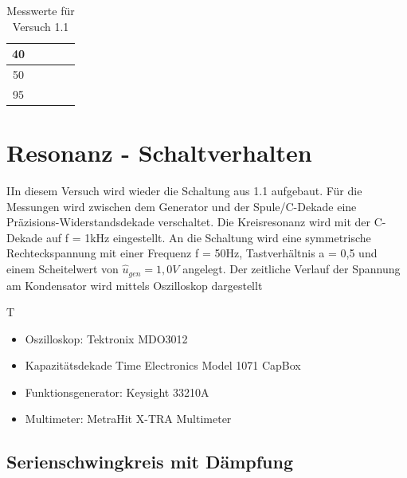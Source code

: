 \documentclass{article}
\begin{document}
\begin{table}[h]
\begin{center}
\begin{tabular}{|c|c|c|c|c|}
      \hline
      40  &                                           &                                          &             &                                   \\
      \hline
      50  &                                           &                                          &             &                                   \\
      \hline
      95  &                                           &                                          &             &                                   \\
      \hline
    \end{tabular}
    \caption{Messwerte für Versuch 1.1}
    \label{tab:MV}
  \end{center}
\end{table}

\newpage
\section{Resonanz - Schaltverhalten}
\begin{task}
  IIn diesem Versuch wird wieder die Schaltung aus 1.1 aufgebaut. Für die Messungen wird zwischen dem Generator und der Spule/C-Dekade eine Präzisions-Widerstandsdekade verschaltet.
  Die Kreisresonanz wird mit der C-Dekade auf f = 1kHz eingestellt. An die Schaltung wird eine symmetrische Rechteckspannung mit einer Frequenz f = 50Hz, Tastverhältnis a = 0,5 und einem Scheitelwert von $\hat{u}_{gen} = 1,0 V$ angelegt.
  Der zeitliche Verlauf der Spannung am Kondensator wird mittels Oszilloskop dargestellt
\end{task}

\begin{devlist}
  T
  \begin{itemize}
    \item Oszilloskop: Tektronix MDO3012
    \item Kapazitätsdekade Time Electronics Model 1071 CapBox
    \item Funktionsgenerator: Keysight 33210A
    \item Multimeter: MetraHit X-TRA Multimeter
  \end{itemize}
\end{devlist}

\subsection{Serienschwingkreis mit Dämpfung}
\end{document}
